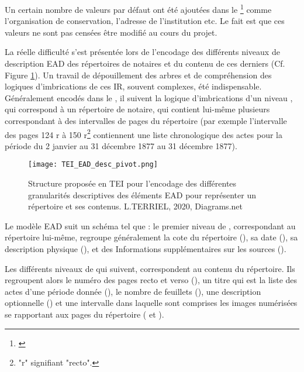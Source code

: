 Un certain nombre de valeurs par défaut ont été ajoutées dans le \footnote{\cite{tei_tei_nodate-23}} comme l'organisation de conservation, l'adresse de l'institution etc. Le fait est que ces valeurs ne sont pas censées être modifié au cours du projet.

La réelle difficulté s'est présentée lors de l'encodage des différents niveaux de description EAD des répertoires de notaires et du contenu de ces derniers (Cf. Figure \ref{fig:TEI_EAD_desc_pivot}). Un travail de dépouillement des arbres et de compréhension des logiques d'imbrications de ces IR, souvent complexes, été indispensable. Généralement encodés dans le , il suivent la logique d'imbrications d'un niveau , qui correspond à un répertoire de notaire, qui contient lui-même plusieurs  correspondant à des intervalles de pages du répertoire (par exemple l'intervalle des pages 124 r à 150 r\footnote{"r" signifiant "recto".} contiennent une liste chronologique des actes pour la période du 2 janvier au 31 décembre 1877 au 31 décembre 1877). 

\begin{figure}[h!]
  \begin{sideways}
    \texttt{[image: TEI\_EAD\_desc\_pivot.png]}
  \end{sideways}
  \centering
  \caption{Structure proposée en TEI pour l'encodage des différentes granularités descriptives des éléments EAD  pour représenter un répertoire et ses contenus. \textcopyright L.TERRIEL, 2020, Diagrams.net}
  \label{fig:TEI_EAD_desc_pivot}
\end{figure}
\clearpage

Le modèle EAD suit un schéma tel que : le premier niveau de , correspondant au répertoire lui-même, regroupe généralement la cote du répertoire (), sa date (), sa description physique (), et des Informations supplémentaires sur les sources (). 

Les différents niveaux de  qui suivent, correspondent au contenu du répertoire. Ils regroupent alors le numéro des pages recto et verso (), un titre qui est la liste des actes d'une période donnée (), le nombre de feuillets (), une description optionnelle () et une intervalle dans laquelle sont comprises les images numérisées se rapportant aux pages du répertoire ( et ).\\

